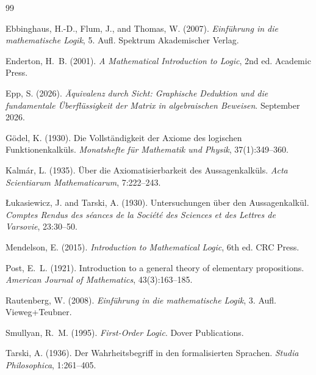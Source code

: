 \documentclass[12pt, a4paper]{article}
\theoremstyle{definition}
\theoremstyle{remark}
\begin{document}

\begin{thebibliography}{99}

Ebbinghaus, H.-D., Flum, J., and Thomas, W. (2007).
\newblock \textit{Einführung in die mathematische Logik}, 5. Aufl.
\newblock Spektrum Akademischer Verlag.

Enderton, H.~B. (2001).
\newblock \textit{A Mathematical Introduction to Logic}, 2nd ed.
\newblock Academic Press.

Epp, S. (2026).
\newblock \textit{Äquivalenz durch Sicht: Graphische Deduktion und die fundamentale Überflüssigkeit der Matrix in algebraischen Beweisen}. September 2026.

Gödel, K. (1930).
\newblock Die Vollständigkeit der Axiome des logischen Funktionenkalküls.
\newblock \textit{Monatshefte für Mathematik und Physik}, 37(1):349--360.

Kalmár, L. (1935).
\newblock Über die Axiomatisierbarkeit des Aussagenkalküls.
\newblock \textit{Acta Scientiarum Mathematicarum}, 7:222--243.

Łukasiewicz, J. and Tarski, A. (1930).
\newblock Untersuchungen über den Aussagenkalkül.
\newblock \textit{Comptes Rendus des séances de la Société des Sciences et des Lettres de Varsovie}, 23:30--50.

Mendelson, E. (2015).
\newblock \textit{Introduction to Mathematical Logic}, 6th ed.
\newblock CRC Press.

Post, E.~L. (1921).
\newblock Introduction to a general theory of elementary propositions.
\newblock \textit{American Journal of Mathematics}, 43(3):163--185.

Rautenberg, W. (2008).
\newblock \textit{Einführung in die mathematische Logik}, 3. Aufl.
\newblock Vieweg+Teubner.

Smullyan, R.~M. (1995).
\newblock \textit{First-Order Logic}.
\newblock Dover Publications.

Tarski, A. (1936).
\newblock Der Wahrheitsbegriff in den formalisierten Sprachen.
\newblock \textit{Studia Philosophica}, 1:261--405.

\end{thebibliography}
\end{document}

